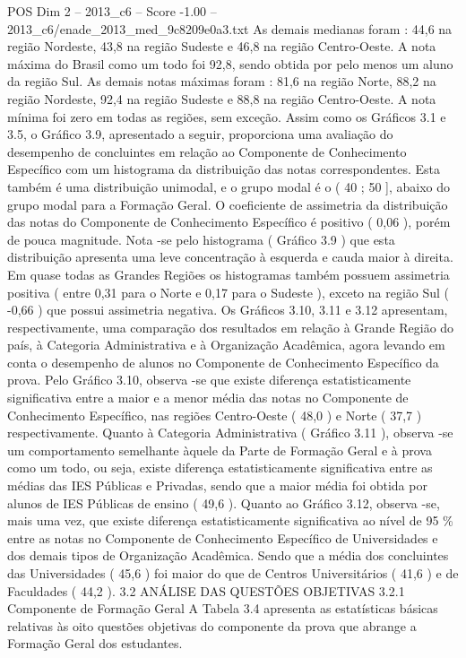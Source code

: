 \begin{textsample}{POS Dim 2 – 2013\_c6 – Score -1.00 – 2013\_c6/enade\_2013\_med\_9c8209e0a3.txt}
As demais medianas foram : 44,6 na região Nordeste, 43,8 na região Sudeste e 46,8 na região Centro-Oeste.
A nota máxima do Brasil como um todo foi 92,8, sendo obtida por pelo menos um aluno da região Sul.
As demais notas máximas foram : 81,6 na região Norte, 88,2 na região Nordeste, 92,4 na região Sudeste e 88,8 na região Centro-Oeste.
A nota mínima foi zero em todas as regiões, sem exceção.
Assim como os Gráficos 3.1 e 3.5, o Gráfico 3.9, apresentado a seguir, proporciona uma avaliação do desempenho de concluintes em relação ao Componente de Conhecimento Específico com um histograma da distribuição das notas correspondentes.
Esta também é uma distribuição unimodal, e o grupo modal é o ( 40 ; 50 ], abaixo do grupo modal para a Formação Geral.
O coeficiente de assimetria da distribuição das notas do Componente de Conhecimento Específico é positivo ( 0,06 ), porém de pouca magnitude.
Nota -se pelo histograma ( Gráfico 3.9 ) que esta distribuição apresenta uma leve concentração à esquerda e cauda maior à direita.
Em quase todas as Grandes Regiões os histogramas também possuem assimetria positiva ( entre 0,31 para o Norte e 0,17 para o Sudeste ), exceto na região Sul ( -0,66 ) que possui assimetria negativa.
Os Gráficos 3.10, 3.11 e 3.12 apresentam, respectivamente, uma comparação dos resultados em relação à Grande Região do país, à Categoria Administrativa e à Organização Acadêmica, agora levando em conta o desempenho de alunos no Componente de Conhecimento Específico da prova.
Pelo Gráfico 3.10, observa -se que existe diferença estatisticamente significativa entre a maior e a menor média das notas no Componente de Conhecimento Específico, nas regiões Centro-Oeste ( 48,0 ) e Norte ( 37,7 ) respectivamente.
Quanto à Categoria Administrativa ( Gráfico 3.11 ), observa -se um comportamento semelhante àquele da Parte de Formação Geral e à prova como um todo, ou seja, existe diferença estatisticamente significativa entre as médias das IES Públicas e Privadas, sendo que a maior média foi obtida por alunos de IES Públicas de ensino ( 49,6 ).
Quanto ao Gráfico 3.12, observa -se, mais uma vez, que existe diferença estatisticamente significativa ao nível de 95 \% entre as notas no Componente de Conhecimento Específico de Universidades e dos demais tipos de Organização Acadêmica.
Sendo que a média dos concluintes das Universidades ( 45,6 ) foi maior do que de Centros Universitários ( 41,6 ) e de Faculdades ( 44,2 ). 3.2 ANÁLISE DAS QUESTÕES OBJETIVAS 3.2.1 Componente de Formação Geral A Tabela 3.4 apresenta as estatísticas básicas relativas às oito questões objetivas do componente da prova que abrange a Formação Geral dos estudantes.

\end{textsample}

